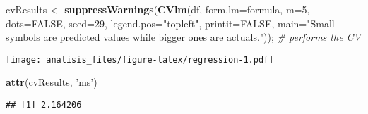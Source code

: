 \documentclass[]{article}
\newenvironment{Shaded}{\begin{snugshade}}{\end{snugshade}}
\newcommand{\CommentTok}[1]{\textcolor[rgb]{0.56,0.35,0.01}{\textit{#1}}}
\newcommand{\DataTypeTok}[1]{\textcolor[rgb]{0.13,0.29,0.53}{#1}}
\newcommand{\DecValTok}[1]{\textcolor[rgb]{0.00,0.00,0.81}{#1}}
\newcommand{\KeywordTok}[1]{\textcolor[rgb]{0.13,0.29,0.53}{\textbf{#1}}}
\newcommand{\NormalTok}[1]{#1}
\newcommand{\OtherTok}[1]{\textcolor[rgb]{0.56,0.35,0.01}{#1}}
\newcommand{\StringTok}[1]{\textcolor[rgb]{0.31,0.60,0.02}{#1}}
\begin{document}
\begin{Shaded}
\begin{Highlighting}[]
\NormalTok{cvResults <-}\StringTok{ }\KeywordTok{suppressWarnings}\NormalTok{(}\KeywordTok{CVlm}\NormalTok{(df, }\DataTypeTok{form.lm=}\NormalTok{formula, }\DataTypeTok{m=}\DecValTok{5}\NormalTok{, }\DataTypeTok{dots=}\OtherTok{FALSE}\NormalTok{, }\DataTypeTok{seed=}\DecValTok{29}\NormalTok{, }\DataTypeTok{legend.pos=}\StringTok{"topleft"}\NormalTok{,  }\DataTypeTok{printit=}\OtherTok{FALSE}\NormalTok{, }\DataTypeTok{main=}\StringTok{"Small symbols are predicted values while bigger ones are actuals."}\NormalTok{));  }\CommentTok{# performs the CV}
\end{Highlighting}
\end{Shaded}

\texttt{[image: analisis\_files/figure-latex/regression-1.pdf]}

\begin{Shaded}
\begin{Highlighting}[]
\KeywordTok{attr}\NormalTok{(cvResults, }\StringTok{'ms'}\NormalTok{)}
\end{Highlighting}
\end{Shaded}

\begin{verbatim}
## [1] 2.164206
\end{verbatim}
\end{document}
